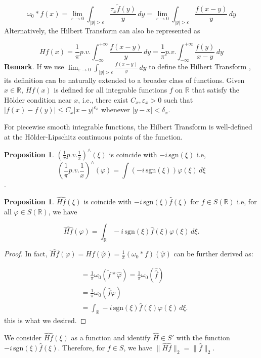 \documentclass[12pt,openany]{book}
\theoremstyle{definition}
\newtheorem{proposition}[theorem]{Proposition}
\begin{document}
$$\omega_0 * f(x) = \lim_{\varepsilon \rightarrow 0} \int_{|y| > \varepsilon} \frac{\tau_x \tilde{f}(y)}{y} \, dy = \lim_{\varepsilon \rightarrow 0} \int_{|y| > \varepsilon} \frac{f(x-y)}{y} \, dy$$
Alternatively, the Hilbert Transform can also be represented as

$$Hf(x) = \frac{1}{\pi} p.v. \int_{-\infty}^{+\infty} \frac{f(x-y)}{y} \, dy = \frac{1}{\pi} p.v. \int_{-\infty}^{+\infty} \frac{f(y)}{x-y} \, dy$$
\noindent\textbf{Remark}. If we use $\lim_{\varepsilon \rightarrow 0} \int_{|y| > \varepsilon} \frac{f(x-y)}{y} \, dy$ to define the Hilbert Transform , its definition can be naturally extended to a broader class of functions. Given $x \in \mathbb{R}$, $Hf(x)$ is defined for all integrable functions $f$ on $\mathbb{R}$ that satisfy the Hölder condition near $x$, i.e., there exist $C_x, \varepsilon_x > 0$ such that $|f(x) - f(y)| \leq C_x |x-y|^{\varepsilon_x}$ whenever $|y-x| < \delta_x$.

For piecewise smooth integrable functions, the Hilbert Transform is well-defined at the Hölder-Lipschitz continuous points of the function.
\begin{proposition}
    $\left(\frac{1}{\pi} p.v. \frac{1}{x}\right)^{\wedge}(\xi) $ is coincide with $ -i \, \text{sgn}(\xi)$ i.e,  $$\left(\frac{1}{\pi} p.v. \frac{1}{x}\right)^{\wedge}(\varphi) = \int (-i \, \text{sgn}(\xi)) \varphi(\xi) \, d\xi$$.
\end{proposition}
\begin{proposition}
    $\widehat{Hf}(\xi) $ is coincide with $ -i \, \text{sgn}(\xi) \hat{f}(\xi)$ for $f \in S(\mathbb{R})$ i.e, for all $\varphi \in S(\mathbb{R})$, we have

$$\widehat{Hf}(\varphi) = \int_{\mathbb{R}} -i \, \text{sgn}(\xi) \hat{f}(\xi) \varphi(\xi) \, d\xi.$$
\end{proposition}
\begin{proof}
    In fact, $\widehat{Hf}(\varphi) = Hf(\hat{\varphi}) = \frac{1}{\pi}(\omega_0 * f)(\hat{\varphi})$ can be further derived as:

$$\begin{aligned}
&= \frac{1}{\pi} \omega_0(\tilde{f} * \hat{\varphi}) = \frac{1}{\pi} \omega_0(\widehat{\hat{f}}) \\
&= \frac{1}{\pi} \omega_0(\hat{f} \varphi) \\
&= \int_{\mathbb{R}} -i \, \text{sgn}(\xi) \hat{f}(\xi) \varphi(\xi) \, d\xi.
\end{aligned}$$
this is what we desired.
\end{proof}
We consider $\widehat{Hf}(\xi)$ as a function and identify $\hat{H} \in S'$ with the function $-i \, \text{sgn}(\xi) \hat{f}(\xi)$. Therefore, for $f \in S$, we have $\|\hat{Hf}\|_2 = \|\hat{f}\|_2$.
\end{document}
